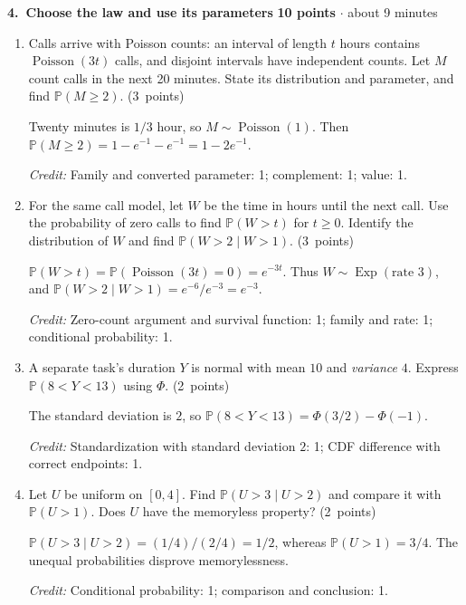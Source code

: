 \documentclass[11pt,letterpaper]{article}
\newcommand{\Prob}{\mathbb P}
\newcommand{\partpts}[1]{\unskip\nobreak\hspace{.3em}%
  \mbox{\small\color{muted}(#1 points)}}
\newcommand{\credit}[1]{\par{\footnotesize\color{muted}\textit{Credit:} #1}}
\newcommand{\problem}[4]{\par\addvspace{8pt}%
  {\large\bfseries\color{indigo}#1.\ #2}\hfill
  {\small\color{muted}\textbf{#3 points} $\cdot$ about #4 minutes}\par\nobreak}
\begin{document}
\newpage
\problem{4}{Choose the law and use its parameters}{10}{9}
\begin{enumerate}
\item Calls arrive with Poisson counts: an interval of length $t$ hours
contains $\operatorname{Poisson}(3t)$ calls, and disjoint intervals have
independent counts. Let $M$ count calls in the next 20 minutes.
State its distribution and parameter, and find $\Prob(M\ge2)$.
\partpts{3}
\begin{solution}[1in]
Twenty minutes is $1/3$ hour, so $M\sim\operatorname{Poisson}(1)$.
Then $\Prob(M\ge2)=1-e^{-1}-e^{-1}=1-2e^{-1}$.
\credit{Family and converted parameter: 1; complement: 1; value: 1.}
\end{solution}
\item For the same call model, let $W$ be the time in hours until the
next call. Use the probability of zero calls to find $\Prob(W>t)$ for
$t\ge0$. Identify the distribution of $W$ and find
$\Prob(W>2\mid W>1)$. \partpts{3}
\begin{solution}[1.1in]
$\Prob(W>t)=\Prob(\operatorname{Poisson}(3t)=0)=e^{-3t}$.
Thus $W\sim\operatorname{Exp}(\text{rate }3)$, and
$\Prob(W>2\mid W>1)=e^{-6}/e^{-3}=e^{-3}$.
\credit{Zero-count argument and survival function: 1;
family and rate: 1; conditional probability: 1.}
\end{solution}
\item A separate task's duration $Y$ is normal with mean $10$ and
\emph{variance} $4$. Express $\Prob(8<Y<13)$ using $\Phi$.
\partpts{2}
\begin{solution}[.9in]
The standard deviation is $2$, so
$\Prob(8<Y<13)=\Phi(3/2)-\Phi(-1)$.
\credit{Standardization with standard deviation $2$: 1;
CDF difference with correct endpoints: 1.}
\end{solution}
\item Let $U$ be uniform on $[0,4]$. Find $\Prob(U>3\mid U>2)$ and
compare it with $\Prob(U>1)$. Does $U$ have the memoryless property?
\partpts{2}
\begin{solution}[.85in]
$\Prob(U>3\mid U>2)=(1/4)/(2/4)=1/2$, whereas
$\Prob(U>1)=3/4$. The unequal probabilities disprove memorylessness.
\credit{Conditional probability: 1; comparison and conclusion: 1.}
\end{solution}
\end{enumerate}
\end{document}

